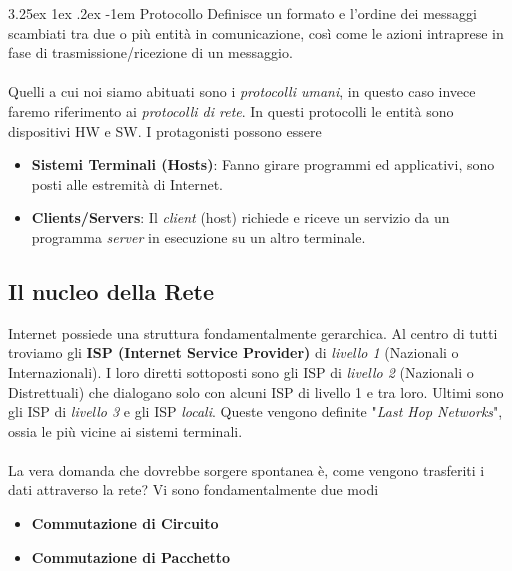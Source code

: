 \documentclass{article}
\makeatletter
\renewcommand\paragraph{\@startsection{paragraph}{5}{\z@}%
  {3.25ex \@plus1ex \@minus.2ex}%
  {-1em}%
  {\normalfont\normalsize\bfseries}}
\makeatother
\begin{document}
        \paragraph{Protocollo} Definisce un formato e l'ordine dei messaggi scambiati tra due o più entità in comunicazione, così come le azioni intraprese in fase di trasmissione/ricezione di un messaggio.\\
        \\
        Quelli a cui noi siamo abituati sono i \textit{protocolli umani}, in questo caso invece faremo riferimento ai \textit{protocolli di rete}. In questi protocolli le entità sono dispositivi HW e SW.
        I protagonisti possono essere
        \begin{itemize}
            \item \textbf{Sistemi Terminali (Hosts)}: Fanno girare programmi ed applicativi, sono posti alle estremità di Internet.
            \item \textbf{Clients/Servers}: Il \textit{client} (host) richiede e riceve un servizio da un programma \textit{server} in esecuzione su un altro terminale.
        \end{itemize}

        \subsection{Il nucleo della Rete}
            Internet possiede una struttura fondamentalmente gerarchica. Al centro di tutti troviamo gli \textbf{ISP (Internet Service Provider)} di \textit{livello 1} (Nazionali o Internazionali). I loro diretti sottoposti sono gli ISP di \textit{livello 2} (Nazionali o Distrettuali) che dialogano solo con alcuni ISP di livello 1 e tra loro. Ultimi sono gli ISP di \textit{livello 3} e gli ISP \textit{locali}. Queste vengono definite "\textit{Last Hop Networks}", ossia le più vicine ai sistemi terminali.\\
            \\
            La vera domanda che dovrebbe sorgere spontanea è, come vengono trasferiti i dati attraverso la rete? Vi sono fondamentalmente due modi
            \begin{itemize}
                \item \textbf{Commutazione di Circuito}
                \item \textbf{Commutazione di Pacchetto}
            \end{itemize}
\end{document}

